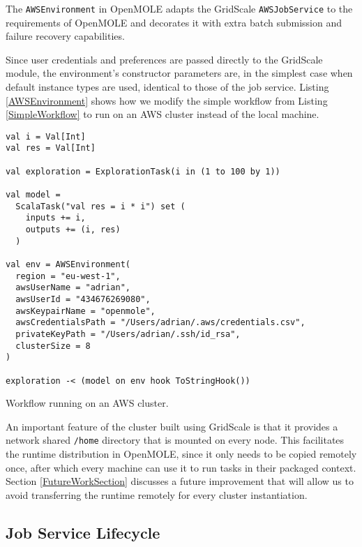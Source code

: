 The \verb|AWSEnvironment| in OpenMOLE adapts the GridScale \verb|AWSJobService| to the requirements of OpenMOLE and decorates it with extra batch submission and failure recovery capabilities. 

Since user credentials and preferences are passed directly to the GridScale module, the environment's constructor parameters are, in the simplest case when default instance types are used, identical to those of the job service. Listing \ref{AWSEnvironment} shows how we modify the simple workflow from Listing \ref{SimpleWorkflow} to run on an AWS cluster instead of the local machine.

\begin{listing}[h]
	\centering
	\begin{minipage}{11.4cm}
		\begin{verbatim}
val i = Val[Int]
val res = Val[Int]

val exploration = ExplorationTask(i in (1 to 100 by 1))

val model =
  ScalaTask("val res = i * i") set (
    inputs += i,
    outputs += (i, res)
  )

val env = AWSEnvironment(
  region = "eu-west-1",
  awsUserName = "adrian",
  awsUserId = "434676269080",
  awsKeypairName = "openmole",
  awsCredentialsPath = "/Users/adrian/.aws/credentials.csv",
  privateKeyPath = "/Users/adrian/.ssh/id_rsa",
  clusterSize = 8
)
  
exploration -< (model on env hook ToStringHook())
		\end{verbatim}
	\end{minipage}
	\caption{Workflow running on an AWS cluster.}
	\label{AWSEnvironment}
\end{listing}

An important feature of the cluster built using GridScale is that it provides a network shared \verb|/home| directory that is mounted on every node. This facilitates the runtime distribution in OpenMOLE, since it only needs to be copied remotely once, after which every machine can use it to run tasks in their packaged context. Section \ref{FutureWorkSection} discusses a future improvement that will allow us to avoid transferring the runtime remotely for every cluster instantiation.

\subsection{Job Service Lifecycle}

